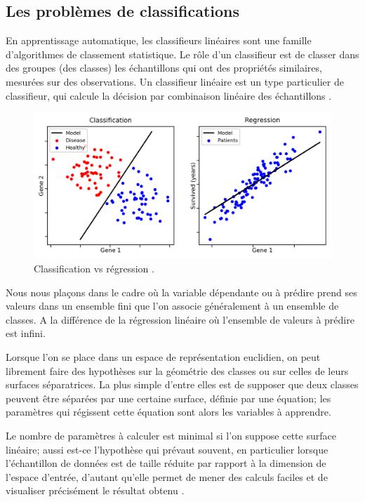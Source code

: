 	
	\subsection{Les problèmes de classifications} \label{sec:classificarion_problem}
	En apprentissage automatique, les classifieurs linéaires sont une famille d'algorithmes de classement statistique. Le rôle d'un classifieur est de classer dans des groupes (des classes) les échantillons qui ont des propriétés similaires, mesurées sur des observations. Un classifieur linéaire est un type particulier de classifieur, qui calcule la décision par combinaison linéaire des échantillons \cite{antoine2018apprentissage}.
	
	\begin{figure}[bth]%
		\centering
		\includegraphics[width=15cm]{images/classification_vs_regression.png}
		\caption[Classification vs Régression.]{Classification vs régression \cite{ml2008python}.}
		\label{fig:class_vs_reg}
	\end{figure}
	
	Nous nous plaçons dans le cadre où la variable dépendante ou à prédire prend ses valeurs dans un ensemble fini que l'on associe généralement à un ensemble de classes. A la différence de la régression linéaire où l’ensemble de valeurs à prédire est infini.
	
	Lorsque l'on se place dans un espace de représentation euclidien, on peut librement faire des hypothèses sur la géométrie des classes ou sur celles de leurs surfaces séparatrices. La plus simple d'entre elles est de supposer que deux classes peuvent être séparées par une certaine surface, définie par une équation; les paramètres qui régissent cette équation sont alors les variables à apprendre.
	
	Le nombre de paramètres à calculer est minimal si l'on suppose cette surface linéaire; aussi est-ce l'hypothèse qui prévaut souvent, en particulier lorsque l'échantillon de données est de taille réduite par rapport à la dimension de l'espace d'entrée, d'autant qu'elle permet de mener des calculs faciles et de visualiser précisément le résultat obtenu \cite{sarkar2017practical}.
	
